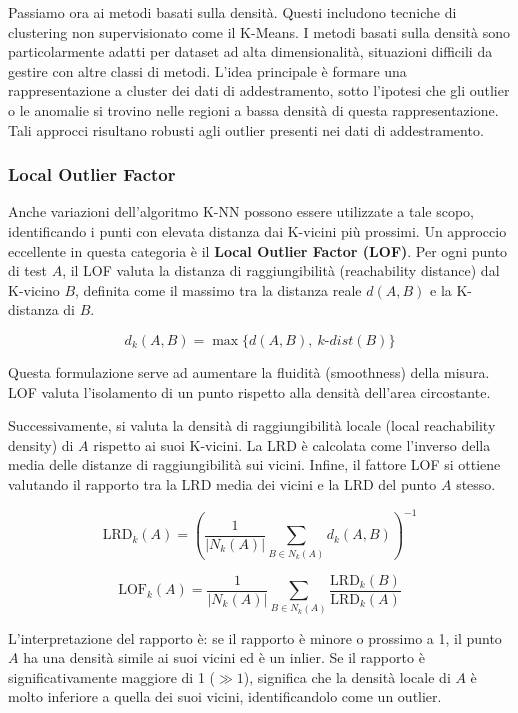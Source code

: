 Passiamo ora ai metodi basati sulla densità. Questi includono
tecniche di clustering non supervisionato come il K-Means.
I metodi basati sulla densità sono particolarmente adatti per
dataset ad alta dimensionalità, situazioni difficili da gestire
con altre classi di metodi. L'idea principale è formare una
rappresentazione a cluster dei dati di addestramento, sotto
l'ipotesi che gli outlier o le anomalie si trovino nelle regioni
a bassa densità di questa rappresentazione. Tali approcci
risultano robusti agli outlier presenti nei dati di addestramento.

\subsubsection{Local Outlier Factor}

Anche variazioni dell'algoritmo K-NN possono essere utilizzate a
tale scopo, identificando i punti con elevata distanza dai
K-vicini più prossimi. Un approccio eccellente in questa
categoria è il \textbf{Local Outlier Factor (LOF)}.
Per ogni punto di test $A$, il LOF valuta la distanza di
raggiungibilità (reachability distance) dal K-vicino $B$,
definita come il massimo tra la distanza reale $d(A, B)$ e la
K-distanza di $B$. 

\begin{equation}
    d_k(A,B) = \max\{d(A,B),\ k\text{-}dist(B)\}
\end{equation}

Questa formulazione serve ad aumentare la
fluidità (smoothness) della misura. LOF valuta l'isolamento
di un punto rispetto alla densità dell'area circostante.

Successivamente, si valuta la densità di raggiungibilità
locale (local reachability density) di $A$ rispetto ai suoi
K-vicini. La LRD è calcolata come l'inverso della media delle
distanze di raggiungibilità sui vicini. Infine, il fattore LOF
si ottiene valutando il rapporto tra la LRD media dei vicini e
la LRD del punto $A$ stesso. 

\begin{equation}
    \mathrm{LRD}_k(A) = \left(\frac{1}{|N_k(A)|}
    \sum_{B \in N_k(A)} d_k(A,B)\right)^{-1}
\end{equation}

\begin{equation}
    \mathrm{LOF}_k(A) = \frac{1}{|N_k(A)|}
    \sum_{B \in N_k(A)} \frac{\mathrm{LRD}_k(B)}{\mathrm{LRD}_k(A)}
\end{equation}

L'interpretazione del rapporto è:
se il rapporto è minore o prossimo a 1, il punto $A$ ha una
densità simile ai suoi vicini ed è un inlier. Se il rapporto è
significativamente maggiore di 1 ($\gg 1$), significa che la
densità locale di $A$ è molto inferiore a quella dei suoi
vicini, identificandolo come un outlier.

